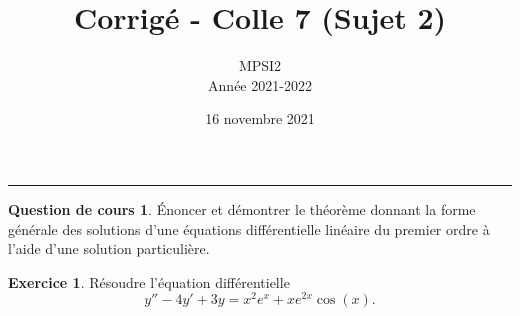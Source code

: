 \documentclass[a4paper, 11pt,openany]{article}%
\title{Corrigé - Colle 7 (Sujet 2)}
\author{MPSI2\\
Année 2021-2022}
\date{16 novembre 2021}
\theoremstyle{plain}
\theoremstyle{definition}
\newtheorem{cours}{Question de cours}
\newtheorem{exo}{Exercice}
\theoremstyle{remark}
\begin{document}
   \maketitle
      \rule{\linewidth}{0.5mm}


\begin{cours}
Énoncer et démontrer le théorème donnant la forme générale des solutions d'une équations différentielle linéaire du premier ordre à l'aide d'une solution particulière.
\end{cours}

\begin{exo}
Résoudre l'équation différentielle
\[ y''-4y' + 3y = x^2e^x + xe^{2x}\cos(x).\]
\end{exo}
\end{document}
